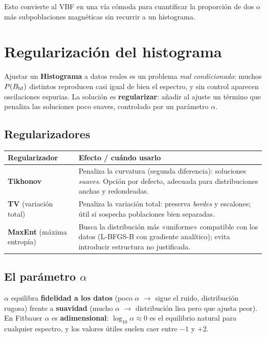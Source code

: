 Esto convierte al VBF en una vía cómoda para cuantificar la proporción de dos o
más subpoblaciones magnéticas sin recurrir a un histograma.

\section{Regularización del histograma}
\label{sec:regularizacion}

Ajustar un \textbf{Histograma} a datos reales es un problema \emph{mal
condicionado}: muchos $P(B_{\mathrm{hf}})$ distintos reproducen casi igual de bien el
espectro, y sin control aparecen oscilaciones espurias. La solución es
\textbf{regularizar}: añadir al ajuste un término que penaliza las soluciones
poco suaves, controlado por un parámetro $\alpha$.

\subsection{Regularizadores}

\begin{center}
\begin{tabular}{@{}lp{}@{}}
\toprule
\textbf{Regularizador} & \textbf{Efecto / cuándo usarlo} \\
\midrule
\textbf{Tikhonov} & Penaliza la curvatura (segunda diferencia): soluciones
\emph{suaves}. Opción por defecto, adecuada para distribuciones anchas y
redondeadas. \\[4pt]
\textbf{TV} (variación total) & Penaliza la variación total: preserva
\emph{bordes} y escalones; útil si sospecha poblaciones bien separadas. \\[4pt]
\textbf{MaxEnt} (máxima entropía) & Busca la distribución más «uniforme»
compatible con los datos (L-BFGS-B con gradiente analítico); evita introducir
estructura no justificada. \\
\bottomrule
\end{tabular}
\end{center}

\subsection{El parámetro $\alpha$}

$\alpha$ equilibra \textbf{fidelidad a los datos} (poco $\alpha$ $\to$ sigue el
ruido, distribución rugosa) frente a \textbf{suavidad} (mucho $\alpha$ $\to$
distribución lisa pero que ajusta peor). En Fitbauer $\alpha$ es
\textbf{adimensional}: $\log_{10}\alpha \approx 0$ es el equilibrio natural para
cualquier espectro, y los valores útiles suelen caer entre $-1$ y $+2$.

